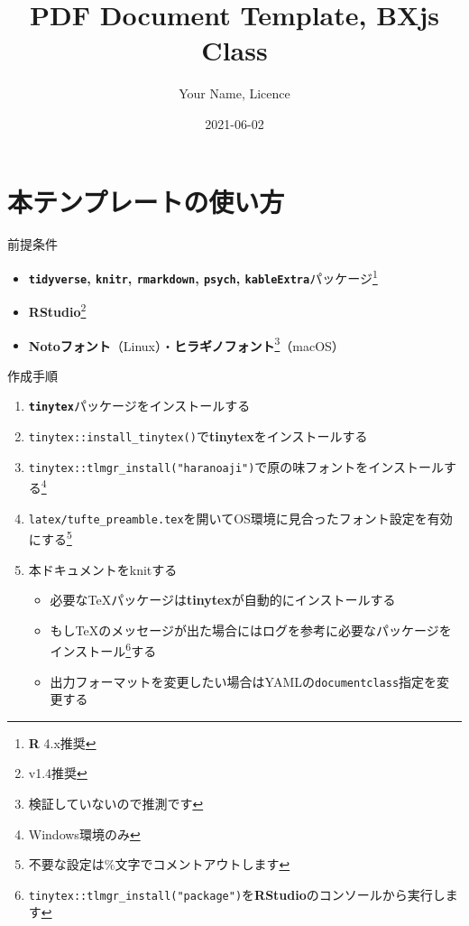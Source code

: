 \documentclass[
  12pt,
  a4paper,
  xelatex,
  ja=standard]{bxjsarticle}
\title{PDF Document Template, BXjs Class}
\author{Your Name, Licence}
\date{2021-06-02}
\providecommand{\tightlist}{%
  \setlength{\itemsep}{0pt}\setlength{\parskip}{0pt}}
\begin{document}
\maketitle

\hypertarget{ux672cux30c6ux30f3ux30d7ux30ecux30fcux30c8ux306eux4f7fux3044ux65b9}{%
\section{本テンプレートの使い方}\label{ux672cux30c6ux30f3ux30d7ux30ecux30fcux30c8ux306eux4f7fux3044ux65b9}}

前提条件

\begin{itemize}
\tightlist
\item
  \textbf{\texttt{tidyverse}, \texttt{knitr}, \texttt{rmarkdown},
  \texttt{psych}, \texttt{kableExtra}}パッケージ\footnote{\textbf{R}
    4.x推奨}
\item
  \textbf{RStudio}\footnote{v1.4推奨}
\item
  \textbf{Notoフォント}（Linux）・\textbf{ヒラギノフォント}\footnote{検証していないので推測です}（macOS）
\end{itemize}

作成手順

\begin{enumerate}
\def\labelenumi{\arabic{enumi}.}
\tightlist
\item
  \textbf{\texttt{tinytex}}パッケージをインストールする
\item
  \texttt{tinytex::install\_tinytex()}で\textbf{tinytex}をインストールする
\item
  \texttt{tinytex::tlmgr\_install("haranoaji")}で原の味フォントをインストールする\footnote{Windows環境のみ}
\item
  \texttt{latex/tufte\_preamble.tex}を開いてOS環境に見合ったフォント設定を有効にする\footnote{不要な設定は\%文字でコメントアウトします}
\item
  本ドキュメントをknitする

  \begin{itemize}
  \tightlist
  \item
    必要なTeXパッケージは\textbf{tinytex}が自動的にインストールする
  \item
    もしTeXのメッセージが出た場合にはログを参考に必要なパッケージをインストール\footnote{\texttt{tinytex::tlmgr\_install("package")}を\textbf{RStudio}のコンソールから実行します}する
  \item
    出力フォーマットを変更したい場合はYAMLの\texttt{documentclass}指定を変更する
  \end{itemize}
\end{enumerate}
\end{document}
